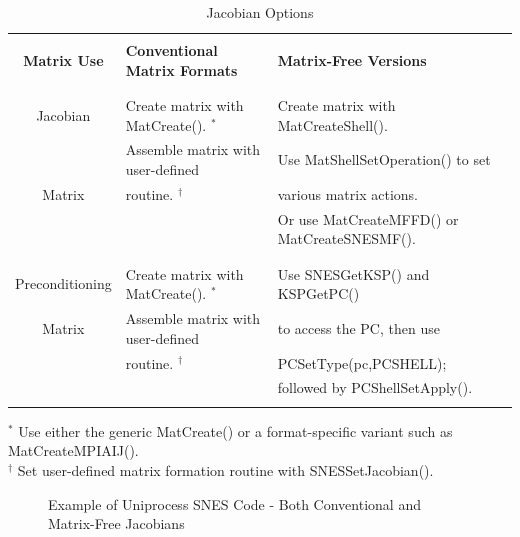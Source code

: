 \begin{center}
\begin{table}[H]
\begin{tabular}{|c|l|l|} \hline
& & \\
{\bf Matrix Use}      & {\bf Conventional Matrix Formats}          & {\bf Matrix-Free Versions}\\ 
& & \\ \hline
& & \\
Jacobian        & Create matrix with MatCreate(). $ ^* $ & Create matrix with MatCreateShell().\\
               & Assemble matrix with user-defined     & Use MatShellSetOperation() to set\\
Matrix          & routine. $ ^\dagger $                         & various matrix actions.\\
                &                                    & Or use MatCreateMFFD() or MatCreateSNESMF().\\
& & \\ \hline
& & \\
Preconditioning  & Create matrix with MatCreate(). $ ^* $ & Use SNESGetKSP() and KSPGetPC() \\
Matrix           & Assemble matrix with user-defined & to access the PC, then use\\
                & routine. $ ^\dagger $         & PCSetType(pc,PCSHELL);\\ 
                &             & followed by PCShellSetApply(). \\

& & \\ \hline
\end{tabular}

\medskip
$ ^* $ Use either the generic MatCreate() or a format-specific variant
   such as MatCreateMPIAIJ().\\
$ ^\dagger $ Set user-defined matrix formation routine with SNESSetJacobian().
\medskip
\caption{Jacobian Options}
\label{tab_jacobians}
\end{table}
\end{center}

\begin{figure}[H]
{\small
{}
}
\caption{Example of Uniprocess SNES Code - Both Conventional and Matrix-Free Jacobians}
\label{fig_snesexample2}
\end{figure} 

